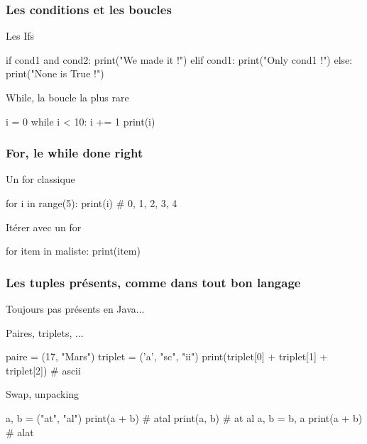 \documentclass{beamer}
\begin{document}
\begin{frame}[fragile]
  \frametitle{Les conditions et les boucles}

  \begin{block}{Les Ifs}
    \begin{python}
if cond1 and cond2:
  print("We made it !")
elif cond1:
  print("Only cond1 !")
else:
  print("None is True !")
    \end{python}
  \end{block}

\pause

  \begin{block}{While, la boucle la plus rare}
    \begin{python}
i = 0
while i < 10:
  i += 1
  print(i)
    \end{python}
  \end{block}

\end{frame}


\begin{frame}[fragile]
  \frametitle{For, le while done right}

  \begin{block}{Un for classique}
    \begin{python}
for i in range(5):
  print(i) # 0, 1, 2, 3, 4
    \end{python}
  \end{block}

  \pause

  \begin{block}{Itérer avec un for}
    \begin{python}
for item in maliste:
  print(item)
    \end{python}
  \end{block}

\end{frame}

\begin{frame}[fragile]
  \frametitle{Les tuples présents, comme dans tout bon langage}

  \centering

  Toujours pas présents en Java...

  \begin{block}{Paires, triplets, ...}
    \begin{python}
paire = (17, "Mars")
triplet = ('a', "sc", "ii")
print(triplet[0] + triplet[1] + triplet[2])
# ascii
    \end{python}
  \end{block}

\pause

  \begin{block}{Swap, unpacking}
    \begin{python}
a, b = ("at", "al")
print(a + b) # atal
print(a, b) # at al
a, b = b, a
print(a + b) # alat
    \end{python}
  \end{block}

\end{frame}
\end{document}
